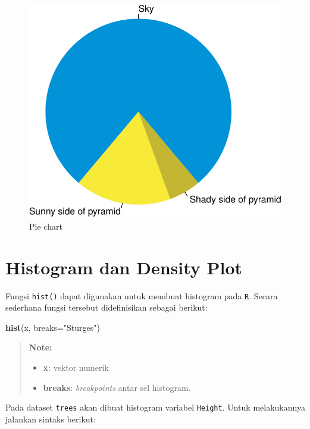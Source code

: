 \documentclass[]{book}
\newenvironment{Shaded}{\begin{snugshade}}{\end{snugshade}}
\newcommand{\KeywordTok}[1]{\textcolor[rgb]{0.13,0.29,0.53}{\textbf{#1}}}
\newcommand{\DataTypeTok}[1]{\textcolor[rgb]{0.13,0.29,0.53}{#1}}
\newcommand{\StringTok}[1]{\textcolor[rgb]{0.31,0.60,0.02}{#1}}
\newcommand{\NormalTok}[1]{#1}
\providecommand{\tightlist}{%
  \setlength{\itemsep}{0pt}\setlength{\parskip}{0pt}}
\begin{document}
\begin{figure}

{\centering \includegraphics[width=0.7\linewidth]{EnvStat_files/figure-latex/pie-1} 

}

\caption{Pie chart}\label{fig:pie}
\end{figure}

\section{Histogram dan Density Plot}\label{histogram-dan-density-plot}

Fungsi \texttt{hist()} dapat digunakan untuk membuat histogram pada
\texttt{R}. Secara sederhana fungsi tersebut didefinisikan sebagai
berikut:

\begin{Shaded}
\begin{Highlighting}[]
\KeywordTok{hist}\NormalTok{(x, }\DataTypeTok{breaks=}\StringTok{"Sturges"}\NormalTok{)}
\end{Highlighting}
\end{Shaded}

\begin{quote}
\textbf{Note: }

\begin{itemize}
\tightlist
\item
  \textbf{x}: vektor numerik
\item
  \textbf{breaks}: \emph{breakpoints} antar sel histogram.
\end{itemize}
\end{quote}

Pada dataset \texttt{trees} akan dibuat histogram variabel
\texttt{Height}. Untuk melakukannya jalankan sintaks berikut:
\end{document}
